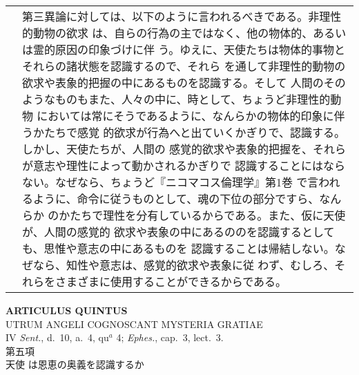 \documentclass[10pt]{jsarticle} %
\begin{document}
\begin{longtable}{p{21em}p{21em}}
&

第三異論に対しては、以下のように言われるべきである。非理性的動物の欲求
は、自らの行為の主ではなく、他の物体的、あるいは霊的原因の印象づけに伴
う。ゆえに、天使たちは物体的事物とそれらの諸状態を認識するので、それら
を通して非理性的動物の欲求や表象的把握の中にあるものを認識する。そして
人間のそのようなものもまた、人々の中に、時として、ちょうど非理性的動物
においては常にそうであるように、なんらかの物体的印象に伴うかたちで感覚
的欲求が行為へと出ていくかぎりで、認識する。しかし、天使たちが、人間の
感覚的欲求や表象的把握を、それらが意志や理性によって動かされるかぎりで
認識することにはならない。なぜなら、ちょうど『ニコマコス倫理学』第1巻
で言われるように、命令に従うものとして、魂の下位の部分ですら、なんらか
のかたちで理性を分有しているからである。また、仮に天使が、人間の感覚的
欲求や表象の中にあるののを認識するとしても、思惟や意志の中にあるものを
認識することは帰結しない。なぜなら、知性や意志は、感覚的欲求や表象に従
わず、むしろ、それらをさまざまに使用することができるからである。

\\


\end{longtable}
\newpage




\begin{center}
{\Large {\bf ARTICULUS QUINTUS}}\\ {\large UTRUM ANGELI COGNOSCANT
MYSTERIA GRATIAE}\\ {\footnotesize IV {\itshape Sent.}, d.~10, a.~4,
qu$^a$ 4; {\itshape Ephes.}, cap.~3, lect.~3.}\\ {\Large 第五項\\天使
は恩恵の奥義を認識するか}
\end{center}
\end{document}
